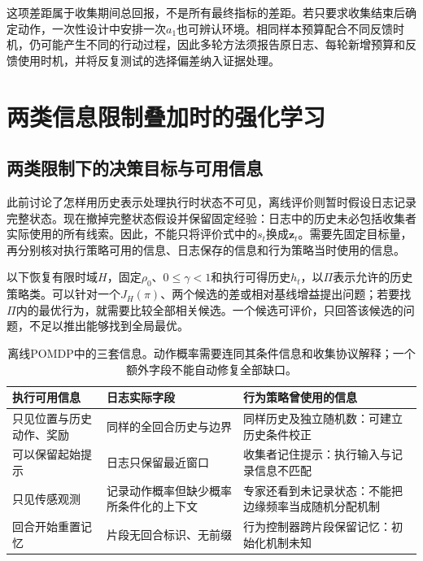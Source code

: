 这项差距属于收集期间总回报，不是所有最终指标的差距。若只要求收集结束后确定动作，一次性设计中安排一次$a_1$也可辨认环境。相同样本预算配合不同反馈时机，仍可能产生不同的行动过程，因此多轮方法须报告原日志、每轮新增预算和反馈使用时机，并将反复测试的选择偏差纳入证据处理。

\section{两类信息限制叠加时的强化学习}
\label{sec:rl-information-combined}

\subsection{两类限制下的决策目标与可用信息}
\label{sec:rl-information-combined-target}

此前讨论了怎样用历史表示处理执行时状态不可见，离线评价则暂时假设日志记录完整状态。现在撤掉完整状态假设并保留固定经验：日志中的历史未必包括收集者实际使用的所有线索。因此，不能只将评价式中的$s_t$换成$\bm z_t$。需要先固定目标量，再分别核对执行策略可用的信息、日志保存的信息和行为策略当时使用的信息。

以下恢复有限时域$H$，固定$\rho_0$、$0\leq\gamma<1$和执行可得历史$h_t$，以$\Pi$表示允许的历史策略类。可以针对一个$J_H(\pi)$、两个候选的差或相对基线增益提出问题；若要找$\Pi$内的最优行为，就需要比较全部相关候选。一个候选可评价，只回答该候选的问题，不足以推出能够找到全局最优。

\begin{table}[htbp]
  \centering
  \small
  \begin{tabularx}{\linewidth}{XXX}
    \toprule
    执行可用信息 & 日志实际字段 & 行为策略曾使用的信息 \\
    \midrule
    只见位置与历史动作、奖励 & 同样的全回合历史与边界 & 同样历史及独立随机数：可建立历史条件校正 \\
    可以保留起始提示 & 日志只保留最近窗口 & 收集者记住提示：执行输入与记录信息不匹配 \\
    只见传感观测 & 记录动作概率但缺少概率所条件化的上下文 & 专家还看到未记录状态：不能把边缘频率当成随机分配机制 \\
    回合开始重置记忆 & 片段无回合标识、无前缀 & 行为控制器跨片段保留记忆：初始化机制未知 \\
    \bottomrule
  \end{tabularx}
  \caption{离线POMDP中的三套信息。动作概率需要连同其条件信息和收集协议解释；一个额外字段不能自动修复全部缺口。}
  \label{tab:rl-information-information-sets}
\end{table}

